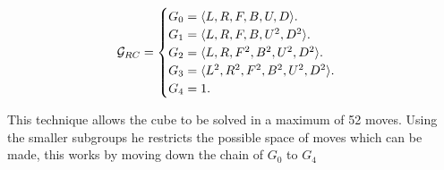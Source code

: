 \documentclass{article}
\DeclarePairedDelimiter{\opair}{\langle}{\rangle}
\begin{document}
\begin{equation}
  \mathcal{G}_{RC}=\begin{cases}
    G_{0} = \text{$\opair{L,R,F,B,U,D}$}.\\
    G_{1} = \text{$\opair{L,R,F,B,U^{2},D^{2}}$}.\\
    G_{2} = \text{$\opair{L,R,F^{2},B^{2},U^{2},D^{2}}$}.\\
    G_{3} = \text{$\opair{L^{2},R^{2},F^{2},B^{2},U^{2},D^{2}}$}.\\
    G_{4} = \text{1}.
  \end{cases}
\end{equation}

This technique allows the cube to be solved in a maximum of 52 moves. Using the smaller subgroups he restricts the possible space of moves which can be made, this works by moving down the chain of $G_{0}$ to $G_{4}$

\newpage



\end{document}
